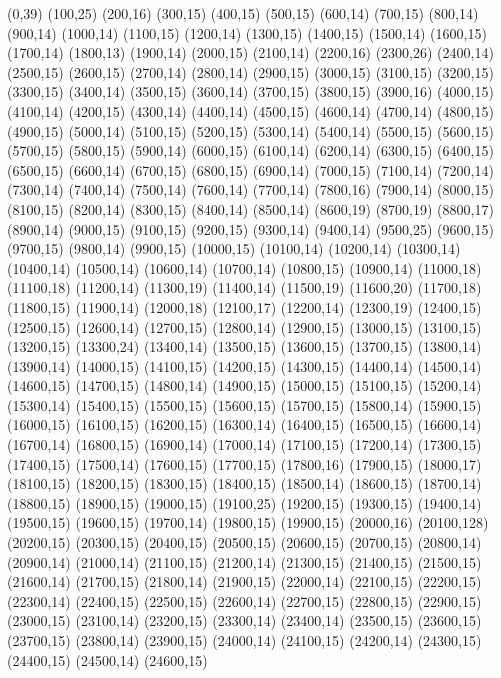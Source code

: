 (0,39)
(100,25)
(200,16)
(300,15)
(400,15)
(500,15)
(600,14)
(700,15)
(800,14)
(900,14)
(1000,14)
(1100,15)
(1200,14)
(1300,15)
(1400,15)
(1500,14)
(1600,15)
(1700,14)
(1800,13)
(1900,14)
(2000,15)
(2100,14)
(2200,16)
(2300,26)
(2400,14)
(2500,15)
(2600,15)
(2700,14)
(2800,14)
(2900,15)
(3000,15)
(3100,15)
(3200,15)
(3300,15)
(3400,14)
(3500,15)
(3600,14)
(3700,15)
(3800,15)
(3900,16)
(4000,15)
(4100,14)
(4200,15)
(4300,14)
(4400,14)
(4500,15)
(4600,14)
(4700,14)
(4800,15)
(4900,15)
(5000,14)
(5100,15)
(5200,15)
(5300,14)
(5400,14)
(5500,15)
(5600,15)
(5700,15)
(5800,15)
(5900,14)
(6000,15)
(6100,14)
(6200,14)
(6300,15)
(6400,15)
(6500,15)
(6600,14)
(6700,15)
(6800,15)
(6900,14)
(7000,15)
(7100,14)
(7200,14)
(7300,14)
(7400,14)
(7500,14)
(7600,14)
(7700,14)
(7800,16)
(7900,14)
(8000,15)
(8100,15)
(8200,14)
(8300,15)
(8400,14)
(8500,14)
(8600,19)
(8700,19)
(8800,17)
(8900,14)
(9000,15)
(9100,15)
(9200,15)
(9300,14)
(9400,14)
(9500,25)
(9600,15)
(9700,15)
(9800,14)
(9900,15)
(10000,15)
(10100,14)
(10200,14)
(10300,14)
(10400,14)
(10500,14)
(10600,14)
(10700,14)
(10800,15)
(10900,14)
(11000,18)
(11100,18)
(11200,14)
(11300,19)
(11400,14)
(11500,19)
(11600,20)
(11700,18)
(11800,15)
(11900,14)
(12000,18)
(12100,17)
(12200,14)
(12300,19)
(12400,15)
(12500,15)
(12600,14)
(12700,15)
(12800,14)
(12900,15)
(13000,15)
(13100,15)
(13200,15)
(13300,24)
(13400,14)
(13500,15)
(13600,15)
(13700,15)
(13800,14)
(13900,14)
(14000,15)
(14100,15)
(14200,15)
(14300,15)
(14400,14)
(14500,14)
(14600,15)
(14700,15)
(14800,14)
(14900,15)
(15000,15)
(15100,15)
(15200,14)
(15300,14)
(15400,15)
(15500,15)
(15600,15)
(15700,15)
(15800,14)
(15900,15)
(16000,15)
(16100,15)
(16200,15)
(16300,14)
(16400,15)
(16500,15)
(16600,14)
(16700,14)
(16800,15)
(16900,14)
(17000,14)
(17100,15)
(17200,14)
(17300,15)
(17400,15)
(17500,14)
(17600,15)
(17700,15)
(17800,16)
(17900,15)
(18000,17)
(18100,15)
(18200,15)
(18300,15)
(18400,15)
(18500,14)
(18600,15)
(18700,14)
(18800,15)
(18900,15)
(19000,15)
(19100,25)
(19200,15)
(19300,15)
(19400,14)
(19500,15)
(19600,15)
(19700,14)
(19800,15)
(19900,15)
(20000,16)
(20100,128)
(20200,15)
(20300,15)
(20400,15)
(20500,15)
(20600,15)
(20700,15)
(20800,14)
(20900,14)
(21000,14)
(21100,15)
(21200,14)
(21300,15)
(21400,15)
(21500,15)
(21600,14)
(21700,15)
(21800,14)
(21900,15)
(22000,14)
(22100,15)
(22200,15)
(22300,14)
(22400,15)
(22500,15)
(22600,14)
(22700,15)
(22800,15)
(22900,15)
(23000,15)
(23100,14)
(23200,15)
(23300,14)
(23400,14)
(23500,15)
(23600,15)
(23700,15)
(23800,14)
(23900,15)
(24000,14)
(24100,15)
(24200,14)
(24300,15)
(24400,15)
(24500,14)
(24600,15)
